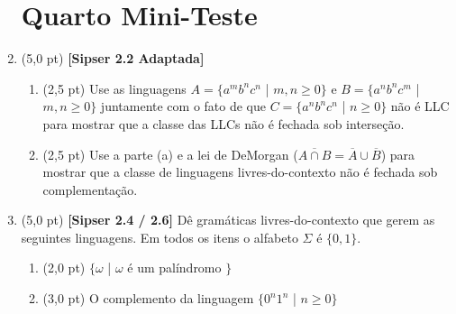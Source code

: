 \documentclass[12pt,a4paper,oneside]{article}
\begin{document}
\begin{enumerate}
	
	\section*{Quarto Mini-Teste}
	
	\item (5,0 pt) {\bf [Sipser 2.2 Adaptada]} 
	\begin{enumerate}
		\item (2,5 pt) Use as linguagens $A = \{a^m b^n c^n$ | $m, n \geq 0\}$ e $B = \{a^n b^n c^m$ | $m, n \geq 0\}$ juntamente com o fato de que $C = \{a^n b^n c^n$ | $n \geq 0\}$ não é LLC para mostrar que a classe das LLCs não é fechada sob interseção.
		\item (2,5 pt) Use a parte (a) e a lei de DeMorgan ($\overline{A \cap B} = \overline{A} \cup \overline{B}$) para mostrar que a classe de linguagens livres-do-contexto não é fechada sob complementação.
	\end{enumerate}
	
	\item (5,0 pt) {\bf [Sipser 2.4 / 2.6]}  Dê gramáticas livres-do-contexto que gerem as seguintes linguagens. Em todos os itens o alfabeto $\Sigma$ é $\{0,1\}$.
	\begin{enumerate}
		\item (2,0 pt) $\{\omega$ | $\omega$ é um palíndromo $\}$
		\item (3,0 pt) O complemento da linguagem $\{0^n 1^n$ | $n \geq 0 \}$
	\end{enumerate}

\end{enumerate}
\end{document}
